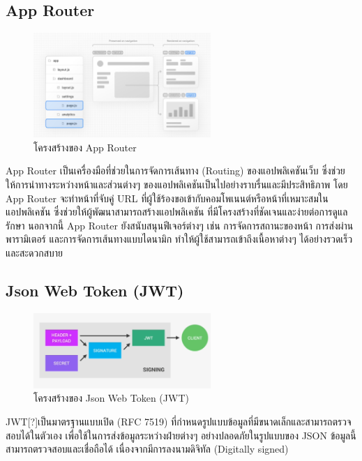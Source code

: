   \subsection{App Router}
    \begin{figure}[!h]
      \centering
      \includegraphics[width=0.6\textwidth]{image/Background/app-router.png}
      \caption[App Router]{โครงสร้างของ App Router}
      \label{fig:app_router_pic}
    \end{figure}
    \FloatBarrier
    \qquad App Router เป็นเครื่องมือที่ช่วยในการจัดการเส้นทาง (Routing) ของแอปพลิเคชันเว็บ
    ซึ่งช่วยให้การนำทางระหว่างหน้าและส่วนต่างๆ ของแอปพลิเคชันเป็นไปอย่างราบรื่นและมีประสิทธิภาพ โดย App Router
    จะทำหน้าที่จับคู่ URL ที่ผู้ใช้ร้องขอเข้ากับคอมโพเนนต์หรือหน้าที่เหมาะสมในแอปพลิเคชัน ซึ่งช่วยให้ผู้พัฒนาสามารถสร้างแอปพลิเคชัน
    ที่มีโครงสร้างที่ชัดเจนและง่ายต่อการดูแลรักษา นอกจากนี้ App Router ยังสนับสนุนฟีเจอร์ต่างๆ เช่น การจัดการสถานะของหน้า
    การส่งผ่านพารามิเตอร์ และการจัดการเส้นทางแบบไดนามิก ทำให้ผู้ใช้สามารถเข้าถึงเนื้อหาต่างๆ ได้อย่างรวดเร็วและสะดวกสบาย
    \cite{AppRouter} \cite{Routing}

  \subsection{Json Web Token (JWT)}
    \begin{figure}[!h]
      \centering
      \includegraphics[width=0.6\textwidth]{image/Background/JWT.png}
      \caption[JWT]{โครงสร้างของ Json Web Token (JWT)}
      \label{fig:jwt_pic}
    \end{figure}
    \FloatBarrier
    \qquad JWT[?]เป็นมาตรฐานแบบเปิด (RFC 7519) ที่กําหนดรูปแบบข้อมูลที่มีขนาดเล็กและสามารถตรวจสอบได้ในตัวเอง
    เพื่อใช้ในการส่งข้อมูลระหว่างฝ่ายต่างๆ อย่างปลอดภัยในรูปแบบของ JSON ข้อมูลนี้สามารถตรวจสอบและเชื่อถือได้
    เนื่องจากมีการลงนามดิจิทัล (Digitally signed) \cite{JWT}

